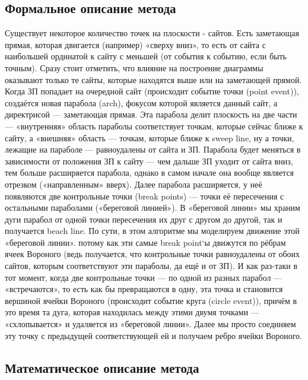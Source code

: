 \documentclass[12 pt, a4paper]{article}
\begin{document}
\subsection{Формальное описание метода}
Существует некоторое количество точек на плоскости - сайтов. Есть заметающая прямая, которая двигается (например) «сверху вниз», то есть от сайта с наибольшей ординатой к сайту с меньшей (от события к событию, если быть точным). Сразу стоит отметить, что влияние на построение диаграммы оказывают только те сайты, которые находятся выше или на заметающей прямой.
Когда ЗП попадает на очередной сайт (происходит событие точки (point event)), создаётся новая парабола (arch), фокусом которой является данный сайт, а директрисой — заметающая прямая. Эта парабола делит плоскость на две части — «внутренняя» область параболы соответствует точкам, которые сейчас ближе к сайту, а «внешняя» область — точкам, которые ближе к sweep line, ну а точки, лежащие на параболе — равноудалены от сайта и ЗП. Парабола будет меняться в зависимости от положения ЗП к сайту — чем дальше ЗП уходит от сайта вниз, тем больше расширяется парабола, однако в самом начале она вообще является отрезком («направленным» вверх). Далее парабола расширяется, у неё появляются две контрольные точки (break points) — точки её пересечения с остальными параболами («береговой линией»). В «береговой линии» мы храним дуги парабол от одной точки пересечения их друг с другом до другой, так и получается beach line. По сути, в этом алгоритме мы моделируем движение этой «береговой линии». потому как эти самые break point`ы движутся по рёбрам ячеек Вороного (ведь получается, что контрольные точки равноудалены от обоих сайтов, которым соответствуют эти параболы, да ещё и от ЗП).
И как раз-таки в тот момент, когда две контрольные точки — по одной из разных парабол — «встречаются», то есть как бы превращаются в одну, эта точка и становится вершиной ячейки Вороного (происходит событие круга (circle event)), причём в это время та дуга, которая находилась между этими двумя точками — «схлопывается» и удаляется из «береговой линии». Далее мы просто соединяем эту точку с предыдущей соответствующей ей и получаем ребро ячейки Вороного.

\newpage
\subsection{Математическое описание метода}
\end{document}
